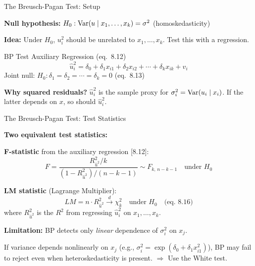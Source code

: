 \documentclass[aspectratio=169, 12pt]{beamer}
\begin{document}
\begin{frame}{The Breusch-Pagan Test: Setup}

  \textbf{Null hypothesis:} $H_0: \operatorname{Var}(u \mid x_1, \ldots, x_k) = \sigma^2$ (homoskedasticity)

  \smallskip

  \textbf{Idea:} Under $H_0$, $u_i^2$ should be unrelated to $x_1, \ldots, x_k$. Test this with a regression.

  \smallskip

  \begin{definitionbox}{BP Test Auxiliary Regression (eq.\ 8.12)}
    \[
      \hat{u}_i^2 = \delta_0 + \delta_1 x_{i1} + \delta_2 x_{i2} + \cdots + \delta_k x_{ik} + v_i
    \]
    Joint null: $H_0: \delta_1 = \delta_2 = \cdots = \delta_k = 0$ (eq.\ 8.13)
  \end{definitionbox}

  \smallskip

  \textbf{Why squared residuals?} $\hat{u}_i^2$ is the sample proxy for $\sigma_i^2 = \operatorname{Var}(u_i \mid x_i)$. If the latter depends on $x$, so should $\hat{u}_i^2$.

\end{frame}

\begin{frame}{The Breusch-Pagan Test: Test Statistics}

  \begin{highlightbox}
    \textbf{Two equivalent test statistics:}

    \smallskip

    \textbf{F-statistic} from the auxiliary regression [8.12]:
    \[
      F = \frac{R_{\hat{u}^2}^2 / k}{(1 - R_{\hat{u}^2}^2)/(n-k-1)} \sim F_{k,\,n-k-1} \quad \text{under } H_0
    \]

    \smallskip

    \textbf{LM statistic} (Lagrange Multiplier):
    \[
      LM = n \cdot R_{\hat{u}^2}^2 \overset{d}{\to} \chi^2_k \quad \text{under } H_0 \quad \text{(eq.\ 8.16)}
    \]
    where $R_{\hat{u}^2}^2$ is the $R^2$ from regressing $\hat{u}_i^2$ on $x_1, \ldots, x_k$.
  \end{highlightbox}

  \smallskip

  \begin{keybox}
    \textbf{Limitation:} BP detects only \textit{linear} dependence of $\sigma_i^2$ on $x_j$.

    If variance depends nonlinearly on $x_j$ (e.g., $\sigma_i^2 = \exp(\delta_0 + \delta_1 x_{i1}^2)$), BP may fail to reject even when heteroskedasticity is present. $\Rightarrow$ Use the White test.
  \end{keybox}

\end{frame}
\end{document}

